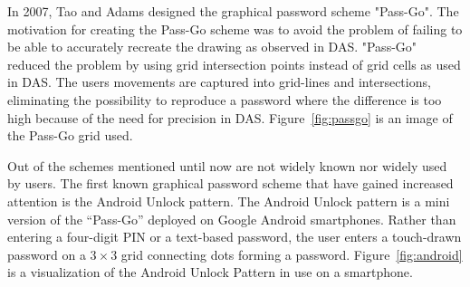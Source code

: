     \begin{figure}[H]
      \centering
    \end{figure}
    
  In 2007, Tao and Adams \cite{Tao} designed the graphical password scheme "Pass-Go". The motivation for creating the Pass-Go scheme was to avoid the problem of failing to be able to accurately recreate the drawing as observed in DAS. "Pass-Go" reduced the problem by using grid intersection points instead of grid cells as used in DAS. The users movements are captured into grid-lines and intersections, eliminating the possibility to reproduce a password where the difference is too high because of the need for precision in DAS. Figure~\ref{fig:passgo} is an image of the Pass-Go grid used.

  Out of the schemes mentioned until now are not widely known nor widely used by users. The first known graphical password scheme that have gained increased attention is the Android Unlock pattern. The Android Unlock pattern is a mini version of the ``Pass-Go'' deployed on Google Android smartphones. Rather than entering a four-digit PIN or a text-based password, the user enters a touch-drawn password on a $3\times3$ grid connecting dots forming a password. Figure~\ref{fig:android} is a visualization of the Android Unlock Pattern in use on a smartphone.

